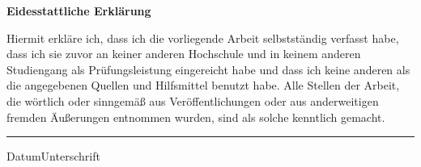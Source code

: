{\Large \textbf{Eidesstattliche Erklärung}}\vspace{0.1cm}

Hiermit erkläre ich, dass ich die vorliegende Arbeit selbstständig verfasst habe, dass ich sie zuvor an keiner anderen Hochschule und in keinem anderen Studiengang als Prüfungsleistung eingereicht habe und dass ich keine anderen als die angegebenen Quellen und Hilfsmittel benutzt habe. Alle Stellen der Arbeit, die wörtlich oder sinngemäß aus Veröffentlichungen oder aus anderweitigen fremden Äußerungen entnommen wurden, sind als solche kenntlich gemacht.\vspace{2.0cm}

\hrule\vspace{0.2cm}

{\small{Datum}}\hfill{\small{Unterschrift}}

